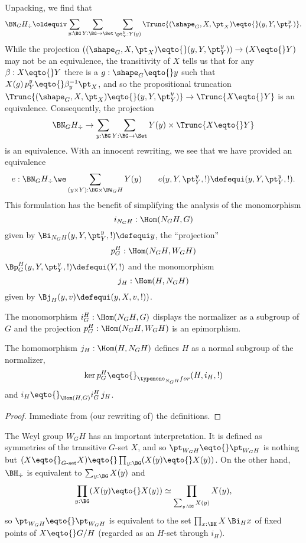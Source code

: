 Unpacking, we find that
$$\BN_GH_\div\oldequiv \sum_{y:\BG}\sum_{Y:\BG\to\Set}\sum_{\pt^y_Y:Y(y)} \Trunc{(\shape_G,X,\pt_X)\eqto{}(y,Y,\pt^y_Y)}.$$
While the projection $((\shape_G,X,\pt_X)\eqto{}(y,Y,\pt^y_Y))\to (X\eqto{}Y)$ may not be an equivalence, the transitivity of $X$ tells us that for any $\beta:X\eqto{}Y$ there is a $g:\shape_G\eqto{}y$ such that $X(g)\,p^y_Y\eqto{}\beta^{-1}_y\pt_X$, and so the propositional truncation $\Trunc{(\shape_G,X,\pt_X)\eqto{}(y,Y,\pt^y_Y)} \to \Trunc{X\eqto{}Y}$ is an equivalence.
Consequently, the projection
$$\BN_GH_\div\to \sum_{y:\BG}\sum_{Y:\BG\to\Set}Y(y)\times\Trunc{X\eqto{}Y}$$
is an equivalence.  With an innocent rewriting, we see that we have provided an equivalence
$$e:\BN_GH_\div\we\sum_{(y\times Y):\BG\times \BW_GH}Y(y)\qquad e(y,Y,\pt^y_Y,!)\defequi (y,Y,\pt^y_Y,!).$$
This formulation has the benefit of simplifying the analysis of the monomorphism
$$i_{N_GH}:\Hom(N_GH,G)$$
given by $\Bi_{N_GH}(y,Y,\pt^y_Y,!)\defequi y$, the ``projection''
 $$p_G^H:\Hom(N_GH,W_GH)$$
$\Bp_G^H(y,Y,\pt^y_Y,!)\defequi (Y,!)$ and the monomorphism
$$j_H:\Hom(H,N_GH)$$
given by $\Bj_H(y,v)\defequi(y,X,v,!))$.




\begin{lemma}
  The monomorphism $i_G^H:\Hom(N_GH,G)$ displays the normalizer as a subgroup of $G$ and the projection $p_G^H:\Hom(N_GH,W_GH)$ is an epimorphism.

The homomorphism $j_H:\Hom(H,N_GH)$ defines $H$ as a normal subgroup of the normalizer,
$$\ker p_G^H\eqto{}_{\typemono_{N_GH}for}(H,i_H,!)$$
and $i_H\eqto{}_{\Hom(H,G)}i_G^H\,j_H$.
\end{lemma}
\begin{proof}
  Immediate from (our rewriting of) the definitions.
\end{proof}

The Weyl group $W_GH$ has an important interpretation.  It is defined as symmetries of the transitive $G$-set $X$, and so $\pt_{W_GH}\eqto{}\pt_{W_GH}$ is nothing but $(X\eqto{}_{G\text{-set}}X)\eqto{}\prod_{y:\BG}(X(y)\eqto{}X(y))$.  On the other hand, $\BH_\div$ is equivalent to $\sum_{y:\BG}X(y)$ and
$$\prod_{y:\BG}(X(y)\eqto{}X(y))\simeq \prod_{\sum_{y:\BG}X(y)}X(y),$$ so $\pt_{W_GH}\eqto{}\pt_{W_GH}$ is equivalent to the set $%
\prod_{x:\BH}X\, \Bi_Hx$ of fixed points of $X\eqto{}G/H$ (regarded as an $H$-set through $i_H$).

